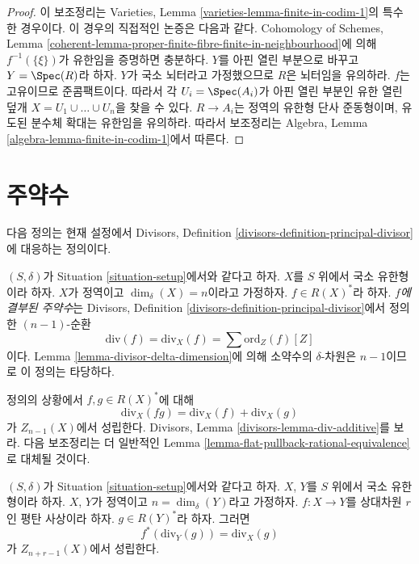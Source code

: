 \begin{proof}
이 보조정리는 Varieties, Lemma
\ref{varieties-lemma-finite-in-codim-1}의 특수한 경우이다. 이 경우의
직접적인 논증은 다음과 같다. Cohomology of Schemes, Lemma
\ref{coherent-lemma-proper-finite-fibre-finite-in-neighbourhood}에 의해
$f^{-1}(\{\xi\})$가 유한임을 증명하면 충분하다. $Y$를 아핀 열린
부분으로 바꾸고 $Y = \Spec(R)$라 하자. $Y$가 국소 뇌터라고 가정했으므로
$R$은 뇌터임을 유의하라. $f$는 고유이므로 준콤팩트이다. 따라서 각
$U_i = \Spec(A_i)$가 아핀 열린 부분인 유한 열린 덮개
$X = U_1 \cup \ldots \cup U_n$을 찾을 수 있다. $R \to A_i$는 정역의
유한형 단사 준동형이며, 유도된 분수체 확대는 유한임을 유의하라. 따라서
보조정리는 Algebra, Lemma \ref{algebra-lemma-finite-in-codim-1}에서
따른다.
\end{proof}


\section{주약수}
\label{section-principal-divisors}

\noindent
다음 정의는 현재 설정에서 Divisors, Definition
\ref{divisors-definition-principal-divisor}에 대응하는 정의이다.

\begin{definition}
\label{definition-principal-divisor}
$(S, \delta)$가 Situation \ref{situation-setup}에서와 같다고 하자.
$X$를 $S$ 위에서 국소 유한형이라 하자. $X$가 정역이고
$\dim_\delta(X) = n$이라고 가정하자. $f \in R(X)^*$라 하자.
{\it $f$에 결부된 주약수}는 Divisors, Definition
\ref{divisors-definition-principal-divisor}에서 정의한 $(n - 1)$-순환
$$
\text{div}(f) = \text{div}_X(f) = \sum \text{ord}_Z(f) [Z]
$$
이다. Lemma \ref{lemma-divisor-delta-dimension}에 의해 소약수의
$\delta$-차원은 $n - 1$이므로 이 정의는 타당하다.
\end{definition}

\noindent
정의의 상황에서 $f, g \in R(X)^*$에 대해
$$
\text{div}_X(fg) = \text{div}_X(f) + \text{div}_X(g)
$$
가 $Z_{n - 1}(X)$에서 성립한다. Divisors, Lemma
\ref{divisors-lemma-div-additive}를 보라. 다음 보조정리는 더 일반적인
Lemma \ref{lemma-flat-pullback-rational-equivalence}로 대체될 것이다.

\begin{lemma}
\label{lemma-flat-pullback-principal-divisor}
$(S, \delta)$가 Situation \ref{situation-setup}에서와 같다고 하자.
$X$, $Y$를 $S$ 위에서 국소 유한형이라 하자. $X$, $Y$가 정역이고
$n = \dim_\delta(Y)$라고 가정하자. $f : X \to Y$를 상대차원 $r$인
평탄 사상이라 하자. $g \in R(Y)^*$라 하자. 그러면
$$
f^*(\text{div}_Y(g)) = \text{div}_X(g)
$$
가 $Z_{n + r - 1}(X)$에서 성립한다.
\end{lemma}

